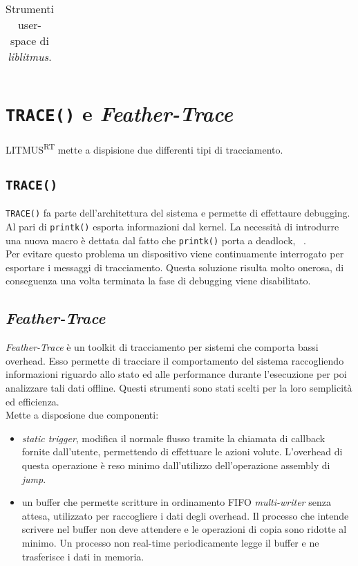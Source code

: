 \begin{appendices}
\begin{table}
\begin{tabular}{|l p{10cm}|}
  	\hline
  	\end{tabular}
  \caption{Strumenti user-space di \textit{liblitmus}.}
  \label{tab:liblitmus_functions}
\end{table}

\section{\texttt{TRACE()} e \textit{Feather-Trace}}
\label{sec:trace}

\noindent LITMUS\textsuperscript{RT} mette a dispisione due differenti tipi di tracciamento.\\

\subsection{\texttt{TRACE()}}

\noindent \texttt{TRACE()} fa parte dell'architettura del sistema e permette di effettaure debugging. Al pari di \texttt{printk()} esporta informazioni dal kernel. La necessità di introdurre una nuova macro è dettata dal fatto che \texttt{printk()} porta a deadlock, ~\cite{BBBThesis}.\\

\noindent Per evitare questo problema un dispositivo viene continuamente interrogato per esportare i messaggi di tracciamento. Questa soluzione risulta molto onerosa, di conseguenza una volta terminata la fase di debugging viene disabilitato.\\

\subsection{\textit{Feather-Trace}}

\noindent \textit{Feather-Trace} è un toolkit di tracciamento per sistemi che comporta bassi overhead. Esso permette di tracciare il comportamento del sistema raccogliendo informazioni riguardo allo stato ed alle performance durante l'esecuzione per poi analizzare tali dati offline. Questi strumenti sono stati scelti per la loro semplicità ed efficienza.\\

\noindent Mette a disposione due componenti:\\

\begin{itemize}
	\item \textit{static trigger}, modifica il normale flusso tramite la chiamata di callback fornite dall'utente, permettendo di effettuare le azioni volute. L'overhead di questa operazione è reso minimo dall'utilizzo dell'operazione assembly di \textit{jump}.
	\item un buffer che permette scritture in ordinamento FIFO \textit{multi-writer} senza attesa, utilizzato per raccogliere i dati degli overhead. Il processo che intende scrivere nel buffer non deve attendere e le operazioni di copia sono ridotte al minimo. Un processo non real-time periodicamente legge il buffer e ne trasferisce i dati in memoria.\\
\end{itemize}


\end{appendices}

